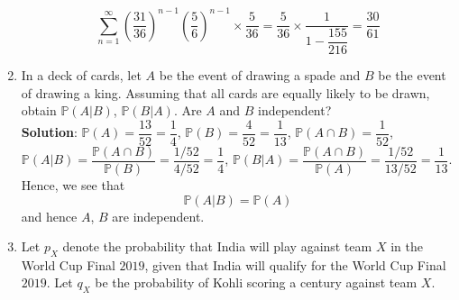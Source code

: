 \documentclass{article}
\newcommand{\dsum}{\displaystyle\sum}
\newcommand{\dcap}{\displaystyle\cap}
\newcommand{\Pb}{\mathbb{P}}
\newcommand{\bkt}[1]{\left(#1\right)}
\newcommand{\soln}[1]{\textbf{Solution}: #1}
\begin{document}
\begin{enumerate}
{		$$\dsum_{n=1}^{\infty} \bkt{\dfrac{31}{36}}^{n-1} \bkt{\dfrac{5}6}^{n-1} \times \dfrac5{36} = \dfrac5{36} \times \dfrac1{1-\dfrac{155}{216}} = \dfrac{30}{61}$$
		}
		\item
		In a deck of cards, let $A$ be the event of drawing a spade and $B$ be the event of drawing a king. Assuming that all cards are equally likely to be drawn, obtain $\Pb(A \vert B)$, $\Pb (B \vert A)$. Are $A$ and $B$ independent?\\
		\soln{
		$\Pb(A) = \dfrac{13}{52} = \dfrac14$, $\Pb(B) = \dfrac4{52} = \dfrac1{13}$, $\Pb\bkt{A \dcap B} = \dfrac1{52}$, $\Pb\bkt{A \vert B} = \dfrac{\Pb\bkt{A \dcap B}}{\Pb\bkt{B}} = \dfrac{1/52}{4/52} = \dfrac14$, $\Pb \bkt{B \vert A} = \dfrac{\Pb\bkt{A \dcap B}}{\Pb(A)} = \dfrac{1/52}{13/52} = \dfrac1{13}$. Hence, we see that
		$$\Pb\bkt{A \vert B} = \Pb\bkt{A}$$
		and hence $A$, $B$ are independent.
		}
		\item
		Let $p_X$ denote the probability that India will play against team $X$ in the World Cup Final $2019$, given that India will qualify for the World Cup Final $2019$. Let $q_X$ be the probability of Kohli scoring a century against team $X$.


\end{enumerate}
\end{document}
